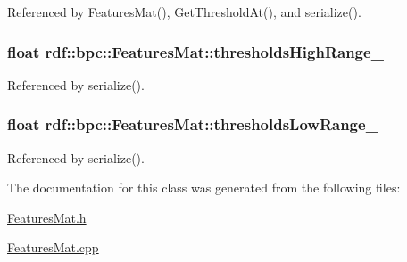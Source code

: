 Referenced by Features\+Mat(), Get\+Threshold\+At(), and serialize().

\subsubsection[{\texorpdfstring{thresholds\+High\+Range\+\_\+}{thresholdsHighRange_}}]{\setlength{\rightskip}{0pt plus 5cm}float rdf\+::bpc\+::\+Features\+Mat\+::thresholds\+High\+Range\+\_\+\hspace{0.3cm}{\ttfamily [private]}}\hypertarget{classrdf_1_1bpc_1_1FeaturesMat_a0458cdc2eafc76455938ab3d54fcb762}{}\label{classrdf_1_1bpc_1_1FeaturesMat_a0458cdc2eafc76455938ab3d54fcb762}


Referenced by serialize().

\subsubsection[{\texorpdfstring{thresholds\+Low\+Range\+\_\+}{thresholdsLowRange_}}]{\setlength{\rightskip}{0pt plus 5cm}float rdf\+::bpc\+::\+Features\+Mat\+::thresholds\+Low\+Range\+\_\+\hspace{0.3cm}{\ttfamily [private]}}\hypertarget{classrdf_1_1bpc_1_1FeaturesMat_a9b44bbd98c5850168c4c33054d6e5ed2}{}\label{classrdf_1_1bpc_1_1FeaturesMat_a9b44bbd98c5850168c4c33054d6e5ed2}


Referenced by serialize().



The documentation for this class was generated from the following files\+:\begin{DoxyCompactItemize}
\item 
\hyperlink{FeaturesMat_8h}{Features\+Mat.\+h}\item 
\hyperlink{FeaturesMat_8cpp}{Features\+Mat.\+cpp}\end{DoxyCompactItemize}
